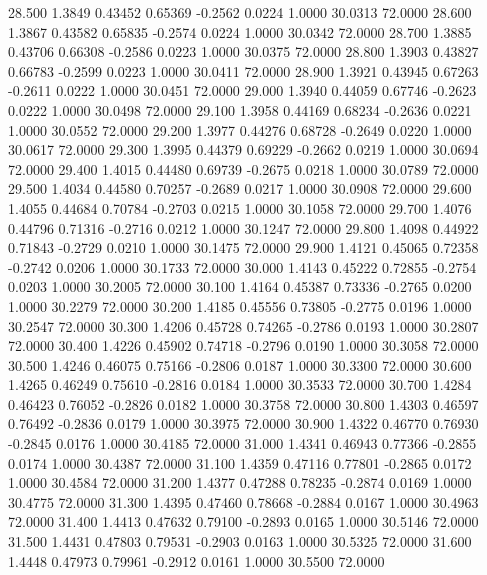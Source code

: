   28.500   1.3849   0.43452   0.65369  -0.2562   0.0224   1.0000  30.0313  72.0000
  28.600   1.3867   0.43582   0.65835  -0.2574   0.0224   1.0000  30.0342  72.0000
  28.700   1.3885   0.43706   0.66308  -0.2586   0.0223   1.0000  30.0375  72.0000
  28.800   1.3903   0.43827   0.66783  -0.2599   0.0223   1.0000  30.0411  72.0000
  28.900   1.3921   0.43945   0.67263  -0.2611   0.0222   1.0000  30.0451  72.0000
  29.000   1.3940   0.44059   0.67746  -0.2623   0.0222   1.0000  30.0498  72.0000
  29.100   1.3958   0.44169   0.68234  -0.2636   0.0221   1.0000  30.0552  72.0000
  29.200   1.3977   0.44276   0.68728  -0.2649   0.0220   1.0000  30.0617  72.0000
  29.300   1.3995   0.44379   0.69229  -0.2662   0.0219   1.0000  30.0694  72.0000
  29.400   1.4015   0.44480   0.69739  -0.2675   0.0218   1.0000  30.0789  72.0000
  29.500   1.4034   0.44580   0.70257  -0.2689   0.0217   1.0000  30.0908  72.0000
  29.600   1.4055   0.44684   0.70784  -0.2703   0.0215   1.0000  30.1058  72.0000
  29.700   1.4076   0.44796   0.71316  -0.2716   0.0212   1.0000  30.1247  72.0000
  29.800   1.4098   0.44922   0.71843  -0.2729   0.0210   1.0000  30.1475  72.0000
  29.900   1.4121   0.45065   0.72358  -0.2742   0.0206   1.0000  30.1733  72.0000
  30.000   1.4143   0.45222   0.72855  -0.2754   0.0203   1.0000  30.2005  72.0000
  30.100   1.4164   0.45387   0.73336  -0.2765   0.0200   1.0000  30.2279  72.0000
  30.200   1.4185   0.45556   0.73805  -0.2775   0.0196   1.0000  30.2547  72.0000
  30.300   1.4206   0.45728   0.74265  -0.2786   0.0193   1.0000  30.2807  72.0000
  30.400   1.4226   0.45902   0.74718  -0.2796   0.0190   1.0000  30.3058  72.0000
  30.500   1.4246   0.46075   0.75166  -0.2806   0.0187   1.0000  30.3300  72.0000
  30.600   1.4265   0.46249   0.75610  -0.2816   0.0184   1.0000  30.3533  72.0000
  30.700   1.4284   0.46423   0.76052  -0.2826   0.0182   1.0000  30.3758  72.0000
  30.800   1.4303   0.46597   0.76492  -0.2836   0.0179   1.0000  30.3975  72.0000
  30.900   1.4322   0.46770   0.76930  -0.2845   0.0176   1.0000  30.4185  72.0000
  31.000   1.4341   0.46943   0.77366  -0.2855   0.0174   1.0000  30.4387  72.0000
  31.100   1.4359   0.47116   0.77801  -0.2865   0.0172   1.0000  30.4584  72.0000
  31.200   1.4377   0.47288   0.78235  -0.2874   0.0169   1.0000  30.4775  72.0000
  31.300   1.4395   0.47460   0.78668  -0.2884   0.0167   1.0000  30.4963  72.0000
  31.400   1.4413   0.47632   0.79100  -0.2893   0.0165   1.0000  30.5146  72.0000
  31.500   1.4431   0.47803   0.79531  -0.2903   0.0163   1.0000  30.5325  72.0000
  31.600   1.4448   0.47973   0.79961  -0.2912   0.0161   1.0000  30.5500  72.0000
